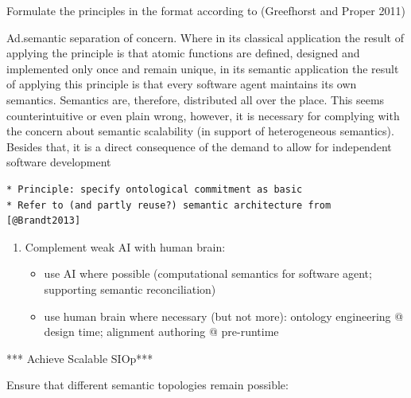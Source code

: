 \documentclass[a4paper,11pt,oneside,oldfontcommands]{memoir}
\newcounter{para}
\theoremstyle{definition}
\theoremstyle{break}		%
\numberwithin{equation}{chapter}
\numberwithin{figure}{chapter}
\begin{document}
Formulate the principles in the format according to (Greefhorst and
Proper 2011)

Ad.semantic separation of concern. Where in its classical application
the result of applying the principle is that atomic functions are
defined, designed and implemented only once and remain unique, in its
semantic application the result of applying this principle is that every
software agent maintains its own semantics. Semantics are, therefore,
distributed all over the place. This seems counterintuitive or even
plain wrong, however, it is necessary for complying with the concern
about semantic scalability (in support of heterogeneous semantics).
Besides that, it is a direct consequence of the demand to allow for
independent software development

\begin{verbatim}
* Principle: specify ontological commitment as basic 
* Refer to (and partly reuse?) semantic architecture from [@Brandt2013]
\end{verbatim}

\begin{enumerate}
\def\labelenumi{\arabic{enumi}.}
\tightlist
\item
  Complement weak AI with human brain:

  \begin{itemize}
  \tightlist
  \item
    use AI where possible (computational semantics for software agent;
    supporting semantic reconciliation)
  \item
    use human brain where necessary (but not more): ontology engineering
    @ design time; alignment authoring @ pre-runtime
  \end{itemize}
\end{enumerate}

*** Achieve Scalable SIOp***

Ensure that different semantic topologies remain possible:
\end{document}
